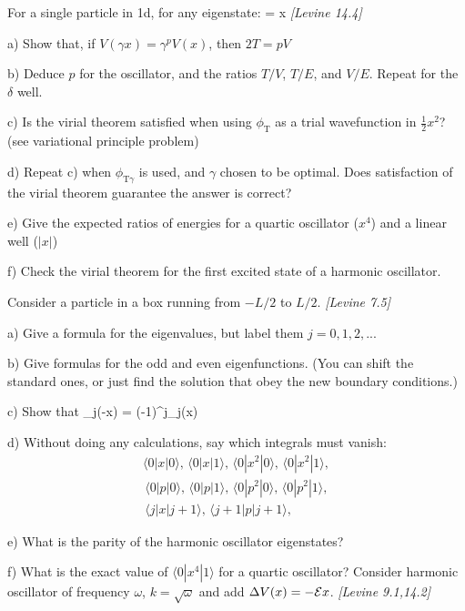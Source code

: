 \newpage
{}
For a single particle in 1d, for any eigenstate:
\langle{}\rangle = \langle x  \rangle
\ee
{\em [Levine 14.4]}

a) Show that, if $V(\gamma x) = \gamma^{p}V(x)$, then $2T = pV$

b) Deduce $p$ for the oscillator, and the ratios $T/V$, $T/E$, and $V/E$.
Repeat for the $\delta$ well.

c) Is the virial theorem satisfied when using $\phi_{\text{T}}$ as a trial wavefunction
in $\frac{1}{2}x^2$? (see variational principle problem)

d) Repeat c) when $\phi_{\text{T}\gamma}$ is used, and $\gamma$ chosen to be
optimal. Does satisfaction of the virial theorem guarantee the answer is
correct?

e) Give the expected ratios of energies for a quartic oscillator ($x^4$) and a
linear well ($|x|$)

f) Check the virial theorem for the first excited state of a harmonic oscillator.

\newpage
{}
Consider a particle in a box running from $-L/2$ to $L/2$.
{\em [Levine 7.5]}

a) Give a formula for the eigenvalues, but label them $j=0,1,2,...$

b) Give formulas for the odd and even eigenfunctions. (You can shift the standard
ones, or just find the solution that obey the new boundary conditions.)

c) Show that
\be
   \phi_j(-x) = (-1)^j\phi_j(x)
\ee

d) Without doing any calculations, say which integrals must vanish:
\begin{align*}
   \langle 0|x|0\rangle,\,\langle 0|x|1 \rangle,\,\langle 0|x^2|0 \rangle,
   \,\langle 0|x^2|1 \rangle,\\
   \,\langle 0|p|0 \rangle,\,\langle 0|p|1 \rangle,\,\langle 0|p^2|0 \rangle,
   \,\langle 0|p^2|1 \rangle,\\
   \,\langle j|x|j+1 \rangle, \,\langle j+1|p|j+1 \rangle,
\end{align*}

e) What is the parity of the harmonic oscillator eigenstates?

f) What is the exact value of $\langle 0|x^4| 1\rangle$ for a quartic oscillator?
\newpage
{}
Consider harmonic oscillator of frequency $\omega$, $k=\sqrt{\omega}$ and add
$\Delta V(x) = -{\cal E} x$.
{\em [Levine 9.1,14.2]}


